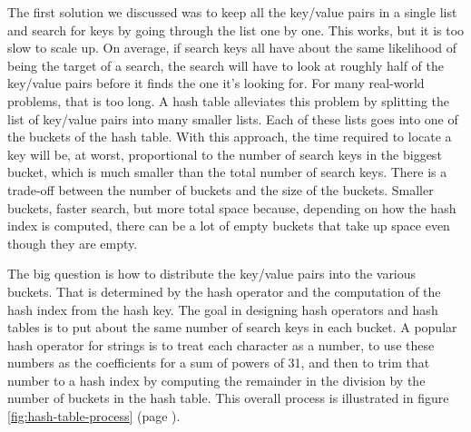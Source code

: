 The first solution we discussed was
to keep all the key/value pairs in a single list
and search for keys by going through the list one by one.
This works, but it is too slow to scale up.
On average, if search keys all have about the same likelihood of
being the target of a search,
the search will have to look at roughly half
of the key/value pairs before it finds the one it's looking for. %
For many real-world problems, that is too long.
A hash table alleviates this problem
by splitting the list of key/value pairs into many smaller lists.
Each of these lists goes into one of the buckets of the hash table.
With this approach, the time required to locate a key
will be, at worst, proportional
to the number of search keys in the biggest bucket,
which is much smaller than the total number of search keys.
There is a trade-off between the number of buckets and the size of the buckets.
Smaller buckets, faster search, but more total space because,
depending on how the hash index is computed,
there can be a lot of empty buckets
that take up space even though they are empty.

The big question is how to distribute the key/value pairs into the various buckets.
That is determined by the hash operator and
the computation of the hash index from the hash key.
The goal in designing hash operators and hash tables
is to put about the same number of search keys in each bucket.
A popular hash operator for
strings is to treat each character as a number, to use these numbers as the
coefficients for a sum of powers of 31, and then to trim that number to
a hash index by computing the remainder in the division by
the number of buckets in the hash table.
This overall process is illustrated
in figure \ref{fig:hash-table-process} (page \pageref{fig:hash-table-process}).

